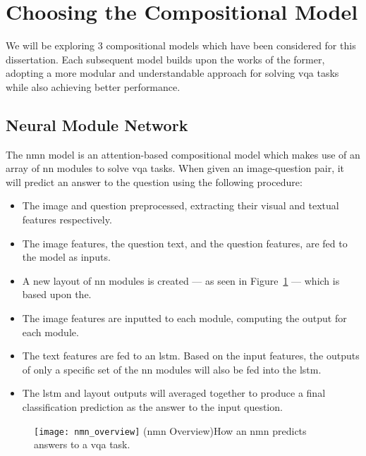 \graphicspath{{content/chapters/literature_review/choosing_the_compositional_model/figures}}

\section{Choosing the Compositional Model}
\label{sec:choosing_the_compositional_model}

We will be exploring 3 compositional models which have been considered for this dissertation.
Each subsequent model builds upon the works of the former, adopting a more modular and understandable approach for solving \gls{vqa} tasks while also achieving better performance.

\subsection{Neural Module Network}
\label{subsec:neural_module_network}

The \gls{nmn} model\cite{andreas_deep_2016} is an attention-based compositional model which makes use of an array of \gls{nn} modules to solve \gls{vqa} tasks.
When given an image-question pair, it will predict an answer to the question using the following procedure:

\begin{itemize}\label{list:nmn_procedure}
    \item The image and question preprocessed, extracting their visual and textual features respectively.
    \item The image features, the question text, and the question features, are fed to the model as inputs.
    \item A new layout of \gls{nn} modules is created --- as seen in Figure~\ref{fig:nmn_overview} --- which is based upon the.
    \item The image features are inputted to each module, computing the output for each module.
    \item The text features are fed to an \acrshort{lstm}. Based on the input features, the outputs of only a specific set of the \gls{nn} modules will also be fed into the \acrshort{lstm}.
    \item The \gls{lstm} and layout outputs will averaged together to produce a final classification prediction as the answer to the input question.
\end{itemize}

\begin{figure}[htbp]
    \centering
    \texttt{[image: nmn\_overview]}
    \captionsource(\acrshort{nmn} Overview){How an \acrshort{nmn} predicts answers to a \acrshort{vqa} task. \label{fig:nmn_overview}}{\citeauthor{andreas_deep_2016}\cite{andreas_deep_2016}}
\end{figure}

